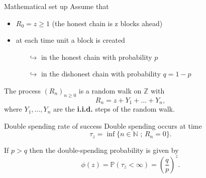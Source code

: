 \documentclass{beamer}
\begin{document}
\begin{frame}{Mathematical set up}
Assume that
\begin{itemize}
\item $R_0=z\geq1$ (the honest chain is z blocks ahead)
\item at each time unit a block is created
\begin{itemize}
\item[$\hookrightarrow$] in the honest chain with probability $p$
\item[$\hookrightarrow$] in the dishonest chain with probability $q=1-p$
\end{itemize}
\end{itemize}
The process $(R_n)_{n\geq0}$ is a random walk on $\mathbb{Z}$ with
$$R_n=z+Y_1+\ldots+Y_n,$$
where $Y_1,\ldots,Y_n$ are the \textbf{i.i.d.} steps of the random walk.\\
\end{frame}
\begin{frame}{Double spending rate of success}
Double spending occurs at time
$$
\tau_z=\inf\{n\in \mathbb{N}\text{ ; }R_n=0\}.
$$

\begin{theorem}
If $p>q$ then the double-spending probability is given by
$$
\phi(z) = \mathbb{P}(\tau_z<\infty)=\left(\frac{q}{p}\right)^{z}.
$$
\end{theorem}
\end{frame}
\end{document}
